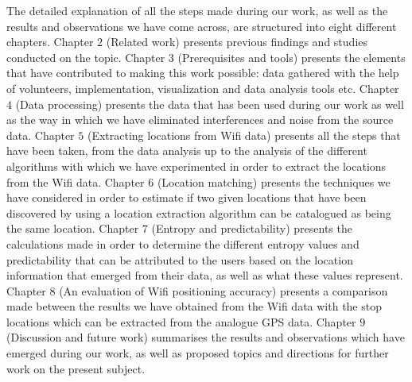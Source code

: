 The detailed explanation of all the steps made during our work, as well as the
results and observations we have come across, are structured into eight
different chapters. Chapter $2$ (Related work) presents previous findings and
studies conducted on the topic. Chapter $3$ (Prerequisites and tools) presents
the elements that have contributed to making this work possible: data gathered
with the help of volunteers, implementation, visualization and data analysis
tools etc. Chapter $4$ (Data processing) presents the data that has been used
during our work as well as the way in which we have eliminated interferences and
noise from the source data. Chapter $5$ (Extracting locations from Wifi data)
presents all the steps that have been taken, from the data analysis up to the
analysis of the different algorithms with which we have experimented in order to
extract the locations from the Wifi data. Chapter $6$ (Location matching)
presents the techniques we have considered in order to estimate if two given
locations that have been discovered by using a location extraction algorithm can
be catalogued as being the same location. Chapter $7$ (Entropy and
predictability) presents the calculations made in order to determine the
different entropy values and predictability that can be attributed to the users
based on the location information that emerged from their data, as well as what
these values represent. Chapter $8$ (An evaluation of Wifi positioning accuracy)
presents a comparison made between the results we have obtained from the Wifi
data with the stop locations which can be extracted from the analogue GPS data.
Chapter $9$ (Discussion and future work) summarises the results and observations
which have emerged during our work, as well as proposed topics and directions
for further work on the present subject.
